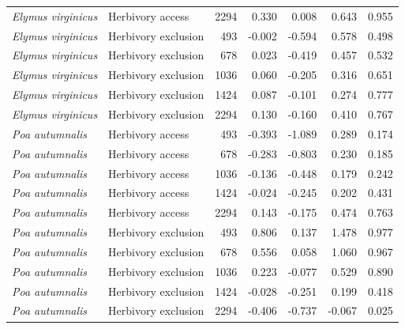 \documentclass[12pt]{article}\usepackage[]{graphicx}\usepackage[dvipsnames]{xcolor}
\begin{document}
{\begin{landscape}
\begin{table}[ht]
\begin{tabular}{llrrrrr}
\textit{Elymus virginicus} & Herbivory access    & 2294 & 0.330  & 0.008  & 0.643 & 0.955 \\
\textit{Elymus virginicus} & Herbivory exclusion & 493  & -0.002 & -0.594 & 0.578 & 0.498 \\
\textit{Elymus virginicus} & Herbivory exclusion & 678  & 0.023  & -0.419 & 0.457 & 0.532 \\
\textit{Elymus virginicus} & Herbivory exclusion & 1036 & 0.060  & -0.205 & 0.316 & 0.651 \\
\textit{Elymus virginicus} & Herbivory exclusion & 1424 & 0.087  & -0.101 & 0.274 & 0.777 \\
\textit{Elymus virginicus} & Herbivory exclusion & 2294 & 0.130  & -0.160 & 0.410 & 0.767 \\
\textit{Poa autumnalis}    & Herbivory access    & 493  & -0.393 & -1.089 & 0.289 & 0.174 \\
\textit{Poa autumnalis}    & Herbivory access    & 678  & -0.283 & -0.803 & 0.230 & 0.185 \\
\textit{Poa autumnalis}    & Herbivory access    & 1036 & -0.136 & -0.448 & 0.179 & 0.242 \\
\textit{Poa autumnalis}    & Herbivory access    & 1424 & -0.024 & -0.245 & 0.202 & 0.431 \\
\textit{Poa autumnalis}    & Herbivory access    & 2294 & 0.143  & -0.175 & 0.474 & 0.763 \\
\textit{Poa autumnalis}    & Herbivory exclusion & 493  & 0.806  & 0.137  & 1.478 & 0.977 \\
\textit{Poa autumnalis}    & Herbivory exclusion & 678  & 0.556  & 0.058  & 1.060 & 0.967 \\
\textit{Poa autumnalis}    & Herbivory exclusion & 1036 & 0.223  & -0.077 & 0.529 & 0.890 \\
\textit{Poa autumnalis}    & Herbivory exclusion & 1424 & -0.028 & -0.251 & 0.199 & 0.418 \\
\textit{Poa autumnalis}    & Herbivory exclusion & 2294 & -0.406 & -0.737 & -0.067 & 0.025 \\
\hline

\end{tabular}
\end{table}
\end{landscape}
\clearpage

}
\end{document}
